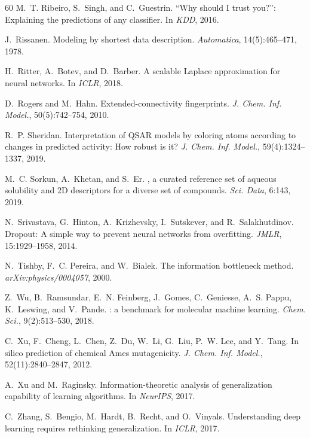 \documentclass[10pt,twocolumn,letterpaper]{article}
\theoremstyle{definition}
\begin{document}
\begin{thebibliography}{60}
M.~T. Ribeiro, S.~Singh, and C.~Guestrin.
\newblock ``Why should {I} trust you?'': Explaining the predictions of any classifier.
\newblock In \emph{KDD}, 2016.

J.~Rissanen.
\newblock Modeling by shortest data description.
\newblock \emph{Automatica}, 14(5):465--471, 1978.

H.~Ritter, A.~Botev, and D.~Barber.
\newblock A scalable {L}aplace approximation for neural networks.
\newblock In \emph{ICLR}, 2018.

D.~Rogers and M.~Hahn.
\newblock Extended-connectivity fingerprints.
\newblock \emph{J. Chem. Inf. Model.}, 50(5):742--754, 2010.

R.~P. Sheridan.
\newblock Interpretation of {QSAR} models by coloring atoms according to changes in predicted activity: How robust is it?
\newblock \emph{J. Chem. Inf. Model.}, 59(4):1324--1337, 2019.

M.~C. Sorkun, A.~Khetan, and S.~Er.
, a curated reference set of aqueous solubility and {2D} descriptors for a diverse set of compounds.
\newblock \emph{Sci. Data}, 6:143, 2019.

N.~Srivastava, G.~Hinton, A.~Krizhevsky, I.~Sutskever, and R.~Salakhutdinov.
\newblock Dropout: A simple way to prevent neural networks from overfitting.
\newblock \emph{JMLR}, 15:1929--1958, 2014.

N.~Tishby, F.~C. Pereira, and W.~Bialek.
\newblock The information bottleneck method.
\newblock \emph{arXiv:physics/0004057}, 2000.

Z.~Wu, B.~Ramsundar, E.~N. Feinberg, J.~Gomes, C.~Geniesse, A.~S. Pappu, K.~Leswing, and V.~Pande.
: a benchmark for molecular machine learning.
\newblock \emph{Chem. Sci.}, 9(2):513--530, 2018.

C.~Xu, F.~Cheng, L.~Chen, Z.~Du, W.~Li, G.~Liu, P.~W. Lee, and Y.~Tang.
\newblock In silico prediction of chemical {A}mes mutagenicity.
\newblock \emph{J. Chem. Inf. Model.}, 52(11):2840--2847, 2012.

A.~Xu and M.~Raginsky.
\newblock Information-theoretic analysis of generalization capability of learning algorithms.
\newblock In \emph{NeurIPS}, 2017.

C.~Zhang, S.~Bengio, M.~Hardt, B.~Recht, and O.~Vinyals.
\newblock Understanding deep learning requires rethinking generalization.
\newblock In \emph{ICLR}, 2017.

\end{thebibliography}
\endgroup
\end{document}
